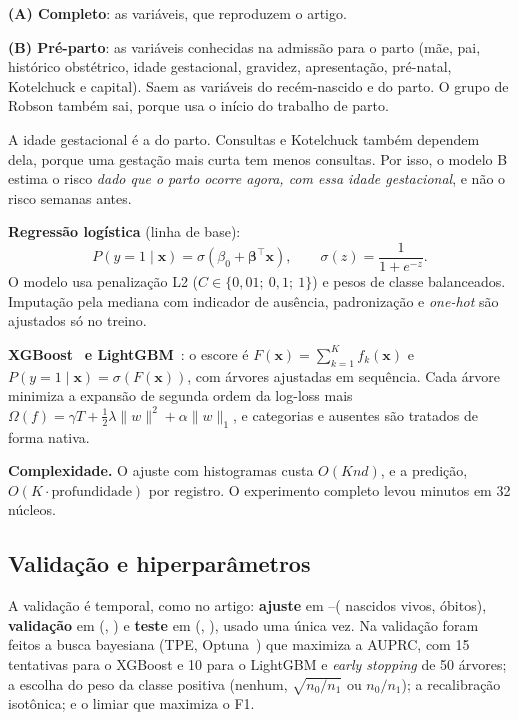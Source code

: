 \documentclass[12pt]{article}
\begin{document}
\textbf{(A) Completo}: as \nVarsA{} variáveis, que reproduzem o artigo.

\textbf{(B) Pré-parto}: as \nVarsB{} variáveis conhecidas na admissão para o parto (mãe, pai, histórico obstétrico, idade gestacional, gravidez, apresentação, pré-natal, Kotelchuck e capital). Saem as variáveis do recém-nascido e do parto. O grupo de Robson também sai, porque usa o início do trabalho de parto.

A idade gestacional é a do parto. Consultas e Kotelchuck também dependem dela, porque uma gestação mais curta tem menos consultas. Por isso, o modelo B estima o risco \emph{dado que o parto ocorre agora, com essa idade gestacional}, e não o risco semanas antes.

\textbf{Regressão logística} (linha de base):
\begin{equation}
P(y{=}1\mid\mathbf{x}) = \sigma(\beta_0 + \boldsymbol\beta^\top\mathbf{x}), \qquad \sigma(z) = \frac{1}{1+e^{-z}}.
\end{equation}
O modelo usa penalização L2 ($C \in \{0{,}01;\ 0{,}1;\ 1\}$) e pesos de classe balanceados. Imputação pela mediana com indicador de ausência, padronização e \textit{one-hot} são ajustados só no treino.

\textbf{XGBoost}~\cite{chen2016} \textbf{e LightGBM}~\cite{ke2017}: o escore é $F(\mathbf{x}) = \sum_{k=1}^{K} f_k(\mathbf{x})$ e $P(y{=}1\mid\mathbf{x}) = \sigma(F(\mathbf{x}))$, com árvores ajustadas em sequência. Cada árvore minimiza a expansão de segunda ordem da log-loss mais $\Omega(f) = \gamma T + \tfrac{1}{2}\lambda\lVert w\rVert^2 + \alpha\lVert w\rVert_1$, e categorias e ausentes são tratados de forma nativa.

\textbf{Complexidade.} O ajuste com histogramas custa $O(K n d)$, e a predição, $O(K\cdot\text{profundidade})$ por registro. O experimento completo levou \tempoMin{} minutos em 32 núcleos.

\subsection{Validação e hiperparâmetros}

A validação é temporal, como no artigo: \textbf{ajuste} em \anoIni--\anoAjFim (\nAjuste{} nascidos vivos, \obAjuste{} óbitos), \textbf{validação} em \anoValid{} (\nValid{}, \obValid{}) e \textbf{teste} em \anoTeste{} (\nTeste{}, \obTeste{}), usado uma única vez. Na validação foram feitos a busca bayesiana (TPE, Optuna~\cite{akiba2019}) que maximiza a AUPRC, com 15 tentativas para o XGBoost e 10 para o LightGBM e \textit{early stopping} de 50 árvores; a escolha do peso da classe positiva (nenhum, $\sqrt{n_0/n_1}$ ou $n_0/n_1$); a recalibração isotônica; e o limiar que maximiza o F1.
\end{document}
